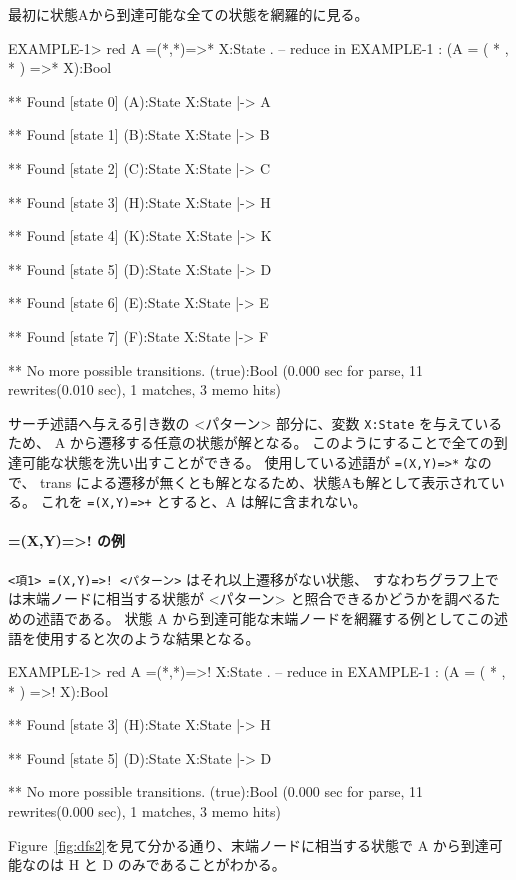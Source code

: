 \documentclass{article}
\begin{document}
最初に状態Aから到達可能な全ての状態を網羅的に見る。
\begin{simplev}
EXAMPLE-1> red A =(*,*)=>* X:State .
-- reduce in EXAMPLE-1 : (A = ( * , * ) =>* X):Bool

** Found [state 0] (A):State
   { X:State |-> A }

** Found [state 1] (B):State
   { X:State |-> B }

** Found [state 2] (C):State
   { X:State |-> C }

** Found [state 3] (H):State
   { X:State |-> H }

** Found [state 4] (K):State
   { X:State |-> K }

** Found [state 5] (D):State
   { X:State |-> D }

** Found [state 6] (E):State
   { X:State |-> E }

** Found [state 7] (F):State
   { X:State |-> F }

** No more possible transitions.
(true):Bool
(0.000 sec for parse, 11 rewrites(0.010 sec), 1 matches, 3 memo hits)
\end{simplev}
サーチ述語へ与える引き数の <パターン> 部分に、変数 \texttt{X:State} を与えているため、
A から遷移する任意の状態が解となる。
このようにすることで全ての到達可能な状態を洗い出すことができる。
使用している述語が \texttt{=(X,Y)=>*} なので、
trans による遷移が無くとも解となるため、状態Aも解として表示されている。
これを \texttt{=(X,Y)=>+} とすると、A は解に含まれない。

\paragraph{=(X,Y)=>! の例}
\texttt{<項1> =(X,Y)=>! <パターン>} はそれ以上遷移がない状態、
すなわちグラフ上では末端ノードに相当する状態が <パターン> と照合できるかどうかを調べるための述語である。
状態 A から到達可能な末端ノードを網羅する例としてこの述語を使用すると次のような結果となる。
\begin{simplev}
EXAMPLE-1> red A =(*,*)=>! X:State .
-- reduce in EXAMPLE-1 : (A = ( * , * ) =>! X):Bool

** Found [state 3] (H):State
   { X:State |-> H }

** Found [state 5] (D):State
   { X:State |-> D }

** No more possible transitions.
(true):Bool
(0.000 sec for parse, 11 rewrites(0.000 sec), 1 matches, 3 memo hits)
\end{simplev}
Figure~\ref{fig:dfs2}を見て分かる通り、末端ノードに相当する状態で A から到達可能なのは H と D のみであることがわかる。
\end{document}
